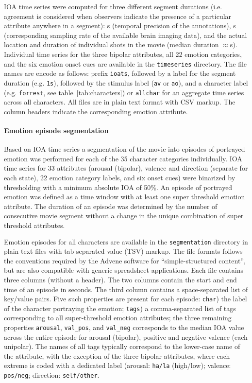 \documentclass[10pt,a4paper,twocolumn]{article}
\begin{document}
IOA time series were computed for three different segment durations (i.e.
agreement is considered when observers indicate the presence of a particular
attribute anywhere in a segment): \unit[1]{s} (temporal precision of the
annotations), \unit[2]{s} (corresponding sampling rate of the available brain
imaging data), and the actual location and duration of individual shots in the
movie (median duration $\approx$\unit[5]{s}). Individual time series for the
three bipolar attributes, all 22 emotion categories, and the six emotion onset
cues are available in the \texttt{timeseries} directory. The file names are
encode as follows: prefix \texttt{ioats}, followed by a label for the segment
duration (e.g. \texttt{1s}), followed by the stimulus label (\texttt{av} or
\texttt{ao}), and a character label (e.g. \texttt{forrest}, see
table~\ref{tab:characters}) or \texttt{allchar} for an aggregate time series
across all characters. All files are in plain text format with CSV markup. The
column headers indicate the corresponding emotion attribute.

\paragraph{Emotion episode segmentation}

Based on IOA time series a segmentation of the movie into episodes of portrayed
emotion was performed for each of the 35 character categories individually. IOA
time series for 33 attributes (arousal (bipolar), valence and direction
(separate for each state), 22 emotion category labels, and six onset cues) were
binarized by thresholding with a minimum absolute IOA of 50\%.  An episode of
portrayed emotion was defined as a time window with at least one super
threshold emotion attribute. The duration of an episode was determined by the
number of consecutive movie segment without a change in the unique combination
of super threshold attributes.

Emotion episodes for all characters are available in the \texttt{segmentation}
directory in plain-text files with tab-separated value (TSV) markup. The file
formats follows the conventions required by the Advene software for
``simple-structured content'', but are also compatible with generic spreadsheet
applications. Each file contains three columns (without a header). The two
columns contain the start and end time of an episode in seconds. The third
column contains a space-separated list of key/value pairs. Five such properties
are present for each episode: \texttt{char}) the label of the character
portraying the emotion; \texttt{tags}) a comma-separated list of tags
corresponding to all super-threshold emotion attributes; the three remaining
properties \texttt{arousal}, \texttt{val\_pos}, and \texttt{val\_neg}
corresponds to the median IOA value across the entire episode for arousal
(bipolar), positive and negative valence (each unipolar). The names of all tags
typically correspond to the lower-case name of the attribute, with the
exception of the three bipolar attributes, where each extreme is coded with a
dedicated label (arousal: \texttt{ha/la} (high/low); valence: \texttt{pos/neg};
direction: \texttt{self/other}.
\end{document}
